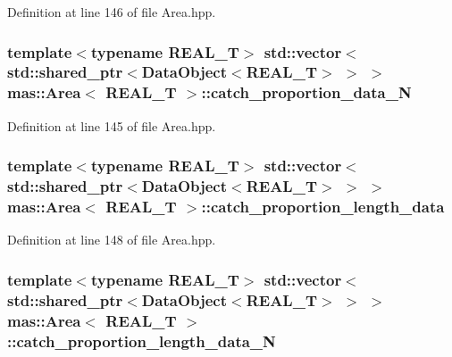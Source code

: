 Definition at line 146 of file Area.\-hpp.

\hypertarget{structmas_1_1_area_a9c253f70d158bb49a41ca2c24d1dbb3b}{
\subsubsection[{catch\-\_\-proportion\-\_\-data\-\_\-\-N}]{\setlength{\rightskip}{0pt plus 5cm}template$<$typename R\-E\-A\-L\-\_\-\-T$>$ std\-::vector$<$std\-::shared\-\_\-ptr$<${\bf Data\-Object}$<$R\-E\-A\-L\-\_\-\-T$>$ $>$ $>$ {\bf mas\-::\-Area}$<$ R\-E\-A\-L\-\_\-\-T $>$\-::catch\-\_\-proportion\-\_\-data\-\_\-\-N}}\label{structmas_1_1_area_a9c253f70d158bb49a41ca2c24d1dbb3b}


Definition at line 145 of file Area.\-hpp.

\hypertarget{structmas_1_1_area_a323cc7addcbd5afb8c3295150afd7cfb}{
\subsubsection[{catch\-\_\-proportion\-\_\-length\-\_\-data}]{\setlength{\rightskip}{0pt plus 5cm}template$<$typename R\-E\-A\-L\-\_\-\-T$>$ std\-::vector$<$std\-::shared\-\_\-ptr$<${\bf Data\-Object}$<$R\-E\-A\-L\-\_\-\-T$>$ $>$ $>$ {\bf mas\-::\-Area}$<$ R\-E\-A\-L\-\_\-\-T $>$\-::catch\-\_\-proportion\-\_\-length\-\_\-data}}\label{structmas_1_1_area_a323cc7addcbd5afb8c3295150afd7cfb}


Definition at line 148 of file Area.\-hpp.

\hypertarget{structmas_1_1_area_a9bd6774752ab571a166a9c0a5fe169aa}{
\subsubsection[{catch\-\_\-proportion\-\_\-length\-\_\-data\-\_\-\-N}]{\setlength{\rightskip}{0pt plus 5cm}template$<$typename R\-E\-A\-L\-\_\-\-T$>$ std\-::vector$<$std\-::shared\-\_\-ptr$<${\bf Data\-Object}$<$R\-E\-A\-L\-\_\-\-T$>$ $>$ $>$ {\bf mas\-::\-Area}$<$ R\-E\-A\-L\-\_\-\-T $>$\-::catch\-\_\-proportion\-\_\-length\-\_\-data\-\_\-\-N}}\label{structmas_1_1_area_a9bd6774752ab571a166a9c0a5fe169aa}


